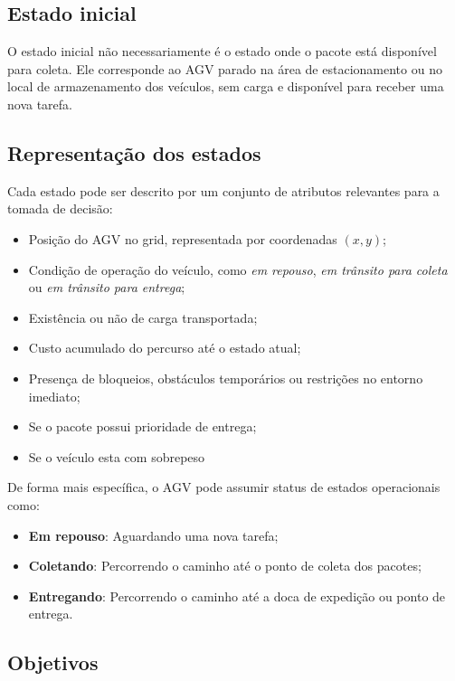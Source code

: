 \documentclass[12pt,a4paper]{article}
\begin{document}
\subsection{Estado inicial}

O estado inicial não necessariamente é o estado onde o pacote está disponível para coleta. Ele corresponde ao \ac{AGV} parado na área de estacionamento ou no local de armazenamento dos veículos, sem carga e disponível para receber uma nova tarefa. 

\subsection{Representação dos estados}

Cada estado pode ser descrito por um conjunto de atributos relevantes para a tomada de decisão:

\begin{itemize}
    \item Posição do \ac{AGV} no grid, representada por coordenadas $(x, y)$;
    \item Condição de operação do veículo, como \textit{em repouso}, \textit{em trânsito para coleta} ou \textit{em trânsito para entrega};
    \item Existência ou não de carga transportada;
    \item Custo acumulado do percurso até o estado atual;
    \item Presença de bloqueios, obstáculos temporários ou restrições no entorno imediato;
    \item Se o pacote possui prioridade de entrega;
    \item Se o veículo esta com sobrepeso
\end{itemize}


De forma mais específica, o \ac{AGV} pode assumir status de estados operacionais como:

\begin{itemize}
    \item \textbf{Em repouso}: Aguardando uma nova tarefa;
    \item \textbf{Coletando}: Percorrendo o caminho até o ponto de coleta dos pacotes;
    \item \textbf{Entregando}: Percorrendo o caminho até a doca de expedição ou ponto de entrega.
\end{itemize}

\subsection{Objetivos}
\end{document}
